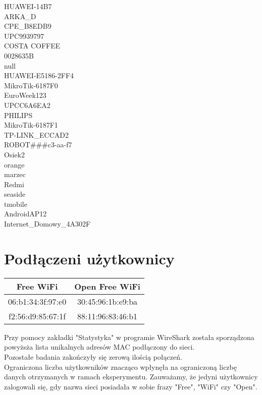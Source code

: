\documentclass[12pt,a4paper]{article}
\begin{document}
\begin{small}
\begin{multicols}{3}
                HUAWEI-14B7\\ARKA\_D\\CPE\_B8EDB9\\UPC9939797\\COSTA COFFEE\\0028635B\\null\\HUAWEI-E5186-2FF4\\
                MikroTik-6187F0\\EuroWeek123\\UPCC6A6EA2\\PHILIPS\\MikroTik-6187F1\\TP-LINK\_ECCAD2\\
                ROBOT\#\#\#c3-aa-f7\\Osiek2\\orange\\marzec\\Redmi\\seaside\\tmobile\\AndroidAP12\\Internet\_Domowy\_4A302F\\
            \end{multicols}
        \end{small}

    \section{Podłączeni użytkownicy}
        \begin{center}
            \begin{tabular}{|c|c|}
                \hline
                Free WiFi & Open Free WiFi\\
                \hline
                06:b1:34:3f:97:e0 & 30:45:96:1b:e9:ba\\
                f2:56:d9:85:67:1f & 88:11:96:83:46:b1\\
                \hline
            \end{tabular}
        \end{center}
        Przy pomocy zakładki "Statystyka" w programie WireShark została sporządzona powyżsża lista unikalnych adresów MAC podłączony do sieci. \\
        Pozostałe badania zakończyły się zerową ilością połączeń. \\
        Ograniczona liczba użytkowników znacząco wpłynęła na ograniczoną liczbę danych otrzymanych w ramach eksperymentu. Zauważamy, że jedyni użytkownicy zalogowali się, gdy nazwa sieci posiadała w sobie frazy "Free", "WiFi" czy "Open".
\end{document}
